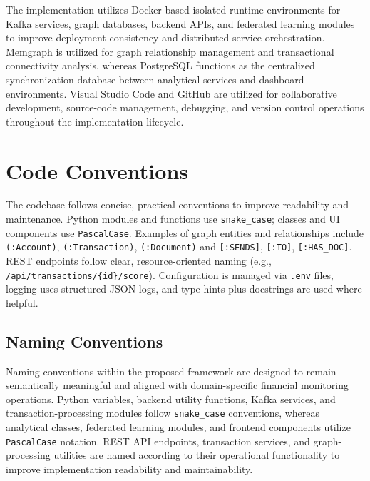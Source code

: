 The implementation utilizes Docker-based isolated runtime environments for Kafka services, graph databases, backend APIs, and federated learning modules to improve deployment consistency and distributed service orchestration. Memgraph is utilized for graph relationship management and transactional connectivity analysis, whereas PostgreSQL functions as the centralized synchronization database between analytical services and dashboard environments. Visual Studio Code and GitHub are utilized for collaborative development, source-code management, debugging, and version control operations throughout the implementation lifecycle.

\section[Code Conventions]{\textbf{Code Conventions}}

The codebase follows concise, practical conventions to improve readability and maintenance. Python modules and functions use \texttt{snake\_case}; classes and UI components use \texttt{PascalCase}. Examples of graph entities and relationships include \texttt{(:Account)}, \texttt{(:Transaction)}, \texttt{(:Document)} and \texttt{[:SENDS]}, \texttt{[:TO]}, \texttt{[:HAS\_DOC]}. REST endpoints follow clear, resource-oriented naming (e.g., \texttt{/api/transactions/\{id\}/score}). Configuration is managed via \texttt{.env} files, logging uses structured JSON logs, and type hints plus docstrings are used where helpful.

\subsection[Naming Conventions]{\textbf{Naming Conventions}}

Naming conventions within the proposed framework are designed to remain semantically meaningful and aligned with domain-specific financial monitoring operations. Python variables, backend utility functions, Kafka services, and transaction-processing modules follow \texttt{snake\_case} conventions, whereas analytical classes, federated learning modules, and frontend components utilize \texttt{PascalCase} notation. REST API endpoints, transaction services, and graph-processing utilities are named according to their operational functionality to improve implementation readability and maintainability.

